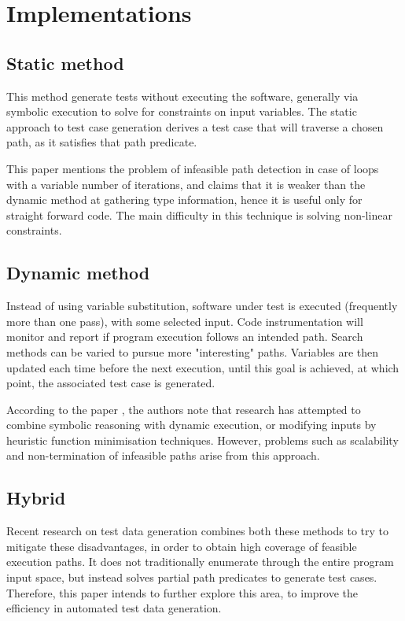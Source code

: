 \documentclass{icldt}
\numberwithin{equation}{section}       %
\begin{document}
\section{Implementations}
\subsection{Static method}
This method generate tests without executing the software, generally via symbolic execution to solve for constraints on input variables. The static approach to test case generation derives a test case that will traverse a chosen path, as it satisfies that path predicate.

This paper \cite{Tahbildar} mentions the problem of infeasible path detection in case of loops with a variable number of iterations, and claims that it is weaker than the dynamic method at gathering type information, hence it is useful only for straight forward code. The main difficulty in this technique is solving non-linear constraints.

\subsection{Dynamic method}
Instead of using variable substitution, software under test is executed (frequently more than one pass), with some selected input. Code instrumentation will monitor and report if program execution follows an intended path. Search methods can be varied to pursue more "interesting" paths. Variables are then updated each time before the next execution, until this goal is achieved, at which point, the associated test case is generated.

According to the paper \cite{Tahbildar}, the authors note that research has attempted to combine symbolic reasoning with dynamic execution, or modifying inputs by heuristic function minimisation techniques. However, problems such as scalability and non-termination of infeasible paths arise from this approach.

\subsection{Hybrid}
Recent research on test data generation combines both these methods to try to mitigate these disadvantages, in order to obtain high coverage of feasible execution paths. It does not traditionally enumerate through the entire program input space, but instead solves partial path predicates to generate test cases. Therefore, this paper intends to further explore this area, to improve the efficiency in automated test data generation.
\end{document}
